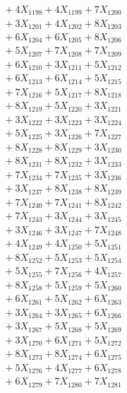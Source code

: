 \documentclass[a4paper,10pt]{article}
\begin{document}
{\begin{align}
&\;  + 4 X_{1198} + 4 X_{1199} + 7 X_{1200} \\[0.3ex]
&\;  + 3 X_{1201} + 4 X_{1202} + 8 X_{1203} \\[0.3ex]
&\;  + 6 X_{1204} + 6 X_{1205} + 8 X_{1206} \\[0.3ex]
&\;  + 5 X_{1207} + 7 X_{1208} + 7 X_{1209} \\[0.5ex]\allowbreak
&\;  + 6 X_{1210} + 3 X_{1211} + 5 X_{1212} \\[0.3ex]
&\;  + 6 X_{1213} + 6 X_{1214} + 5 X_{1215} \\[0.3ex]
&\;  + 7 X_{1216} + 5 X_{1217} + 8 X_{1218} \\[0.3ex]
&\;  + 8 X_{1219} + 5 X_{1220} + 3 X_{1221} \\[0.3ex]
&\;  + 3 X_{1222} + 3 X_{1223} + 3 X_{1224} \\[0.3ex]
&\;  + 5 X_{1225} + 3 X_{1226} + 7 X_{1227} \\[0.3ex]
&\;  + 8 X_{1228} + 8 X_{1229} + 3 X_{1230} \\[0.3ex]
&\;  + 8 X_{1231} + 8 X_{1232} + 3 X_{1233} \\[0.3ex]
&\;  + 7 X_{1234} + 7 X_{1235} + 3 X_{1236} \\[0.3ex]
&\;  + 3 X_{1237} + 8 X_{1238} + 8 X_{1239} \\[0.5ex]\allowbreak
&\;  + 7 X_{1240} + 7 X_{1241} + 8 X_{1242} \\[0.3ex]
&\;  + 7 X_{1243} + 3 X_{1244} + 3 X_{1245} \\[0.3ex]
&\;  + 3 X_{1246} + 3 X_{1247} + 7 X_{1248} \\[0.3ex]
&\;  + 4 X_{1249} + 4 X_{1250} + 5 X_{1251} \\[0.3ex]
&\;  + 8 X_{1252} + 5 X_{1253} + 5 X_{1254} \\[0.3ex]
&\;  + 5 X_{1255} + 7 X_{1256} + 4 X_{1257} \\[0.3ex]
&\;  + 8 X_{1258} + 5 X_{1259} + 5 X_{1260} \\[0.3ex]
&\;  + 6 X_{1261} + 5 X_{1262} + 6 X_{1263} \\[0.3ex]
&\;  + 3 X_{1264} + 3 X_{1265} + 6 X_{1266} \\[0.3ex]
&\;  + 3 X_{1267} + 5 X_{1268} + 5 X_{1269} \\[0.5ex]\allowbreak
&\;  + 3 X_{1270} + 6 X_{1271} + 5 X_{1272} \\[0.3ex]
&\;  + 8 X_{1273} + 8 X_{1274} + 6 X_{1275} \\[0.3ex]
&\;  + 5 X_{1276} + 4 X_{1277} + 6 X_{1278} \\[0.3ex]
&\;  + 6 X_{1279} + 7 X_{1280} + 7 X_{1281} \\[0.3ex]

\end{align}}
\end{document}
